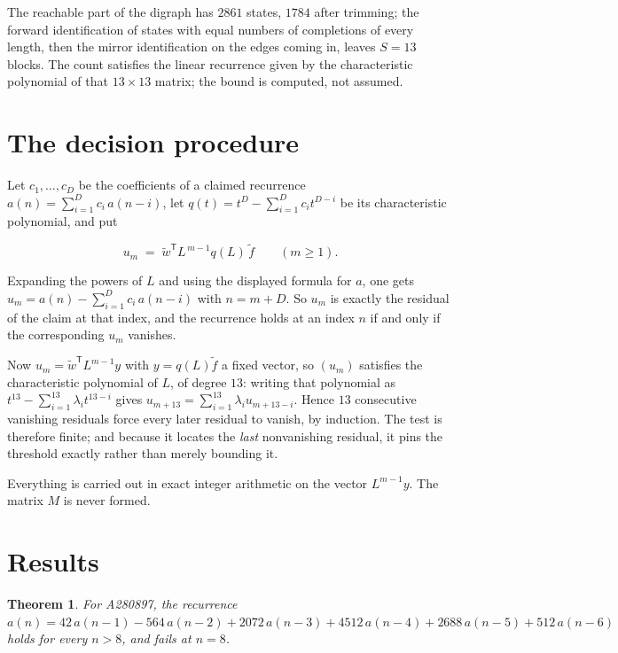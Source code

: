 \documentclass[11pt]{article}
\newtheorem{theorem}{Theorem}
\theoremstyle{definition}
\begin{document}
The reachable part of the digraph has $2861$ states, $1784$ after trimming; the forward identification of states with equal numbers of completions of every length, then the mirror identification on the edges coming in, leaves $S = 13$ blocks. The count satisfies the linear recurrence given by the characteristic polynomial of that $13\times13$ matrix; the bound is computed, not assumed.

\section{The decision procedure}

Let $c_1,\dots,c_D$ be the coefficients of a claimed recurrence $a(n) = \sum_{i=1}^{D} c_i\,a(n-i)$, let $q(t) = t^{D} - \sum_{i=1}^{D} c_i t^{D-i}$ be its characteristic polynomial, and put

\[u_m \;=\; \tilde w^{\mathsf T} L^{\,m-1} q(L)\,\tilde f \qquad (m \ge 1).\]

Expanding the powers of $L$ and using the displayed formula for $a$, one gets $u_m = a(n) - \sum_{i=1}^{D} c_i\,a(n-i)$ with $n = m + D$. So $u_m$ is exactly the residual of the claim at that index, and the recurrence holds at an index $n$ if and only if the corresponding $u_m$ vanishes.

Now $u_m = \tilde w^{\mathsf T} L^{m-1} y$ with $y = q(L)\tilde f$ a fixed vector, so $(u_m)$ satisfies the characteristic polynomial of $L$, of degree $13$: writing that polynomial as $t^{13} - \sum_{i=1}^{13} \lambda_i t^{13-i}$ gives $u_{m+13} = \sum_{i=1}^{13} \lambda_i u_{m+13-i}$. Hence $13$ consecutive vanishing residuals force every later residual to vanish, by induction. The test is therefore finite; and because it locates the {\itshape last} nonvanishing residual, it pins the threshold exactly rather than merely bounding it.

Everything is carried out in exact integer arithmetic on the vector $L^{m-1}y$. The matrix $M$ is never formed.

\section{Results}

\begin{theorem} For A280897, the recurrence $a(n) = 42\,a(n-1) - 564\,a(n-2) + 2072\,a(n-3) + 4512\,a(n-4) + 2688\,a(n-5) + 512\,a(n-6)$ holds for every $n > 8$, and fails at $n = 8$.\end{theorem}
\end{document}
